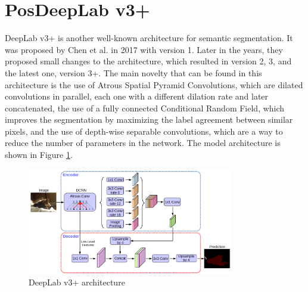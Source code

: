 \section{PosDeepLab v3+}
DeepLab v3+ is another well-known architecture for semantic segmentation. It was
proposed by Chen et al. in 2017 with version 1. Later in the years, they
proposed small changes to the architecture, which resulted in version 2, 3, and
the latest one, version 3+. The main novelty that can be found in this
architecture is the use of Atrous Spatial Pyramid Convolutions, which are
dilated convolutions in parallel, each one with a different dilation rate and
later concatenated, the use of a fully connected Conditional Random Field, which
improves the segmentation by maximizing the label agreement between similar
pixels, and the use of depth-wise separable convolutions, which are a way to
reduce the number of parameters in the network. The model architecture is shown
in Figure \ref{fig:deeplabv3+}.
\begin{figure}[h]
  \centering
  \includegraphics[width=0.8\textwidth]{Images/DeepLabv3+.png}
  \caption{DeepLab v3+ architecture}
  \label{fig:deeplabv3+}
\end{figure}

